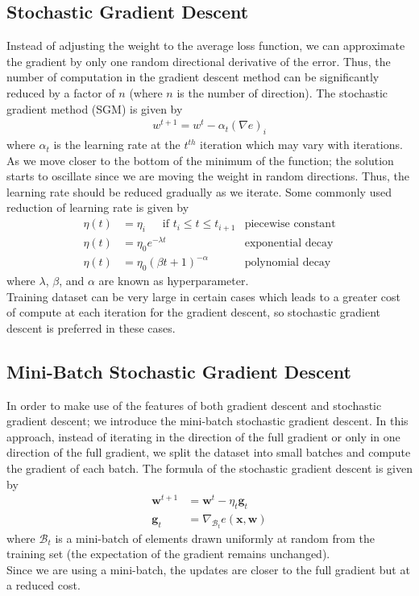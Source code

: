 \subsection{Stochastic Gradient Descent}
Instead of adjusting the weight to the average loss function, we can approximate the gradient by only one random directional derivative of the error. Thus, the number of computation in the gradient descent method can be significantly reduced by a factor of $n$ (where $n$ is the number of direction). The stochastic gradient method (SGM) is given by 
\begin{align}
    \label{eq:SGM_def}
    w^{t+1} = w^{t} - \alpha_t {(\nabla e)}_i
\end{align}
where $\alpha_t$ is the learning rate at the $t^{th}$ iteration which may vary with iterations.\\
As we move closer to the bottom of the minimum of the function; the solution starts to oscillate since we are moving the weight in random directions. Thus, the learning rate should be reduced gradually as we iterate. Some commonly used reduction of learning rate is given by 
\begin{align}
    \label{eq: learning_rates}
        \eta(t) &= \eta_i \,\,\, \,\,\,\, \text{ if } t_i \leq t \leq t_{i+1} &\text{piecewise constant} \\
        \eta(t) &= \eta_0e^{-\lambda t} &\text{exponential decay} \\
        \eta(t) & = \eta_0 (\beta t + 1)^{-\alpha} &\text{polynomial decay}
\end{align}
where $\lambda$, $\beta$, and $\alpha$ are known as hyperparameter. \\
Training dataset can be very large in certain cases which leads to a greater cost of compute at each iteration for the gradient descent, so stochastic gradient descent is preferred in these cases.
\subsection{Mini-Batch Stochastic Gradient Descent}
In order to make use of the features of both gradient descent and stochastic gradient descent; we introduce the mini-batch stochastic gradient descent. In this approach, instead of iterating in the direction of the full gradient or only in one direction of the full gradient, we split the dataset into small batches and compute the gradient of each batch. The formula of the stochastic gradient descent is given by 
\begin{align}
    \label{mb-sgd}
    \textbf{w}^{t+1} &= \textbf{w}^{t} - \eta_t \textbf{g}_t \\
    \nonumber
    \textbf{g}_t &= \nabla_{\mathcal{B}_t}e(\textbf{x},\textbf{w}) 
\end{align}
where $\mathcal{B}_t$ is a mini-batch of elements drawn uniformly at random from the training set (the expectation of the gradient remains unchanged). \\ Since we are using a mini-batch, the updates are closer to the full gradient but at a reduced cost.
